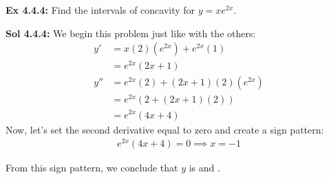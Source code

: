 \begin{tcolorbox}[example]
    \textbf{Ex 4.4.4: } Find the intervals of concavity for $y = xe^{2x}$. 
\end{tcolorbox}
\begin{tcolorbox}[solution]
    \textbf{Sol 4.4.4: } We begin this problem just like with the others: \begin{align*}
        y' &= x(2)\left(e^{2x}\right) + e^{2x}(1) \\[6pt]
        &= e^{2x}(2x + 1) \\[12pt]
        y'' &= e^{2x}(2) + (2x + 1)(2)\left(e^{2x}\right) \\[6pt]
        &= e^{2x}(2 + (2x + 1)(2)) \\[6pt]
        &= e^{2x}(4x + 4)
    \end{align*}
    Now, let's set the second derivative equal to zero and create a sign pattern: \begin{align*}
        e^{2x}(4x + 4) = 0 \implies x = -1
    \end{align*} \begin{center}
    \end{center}
    From this sign pattern, we conclude that $y$ is  and .
\end{tcolorbox} \vspace{11pt}

